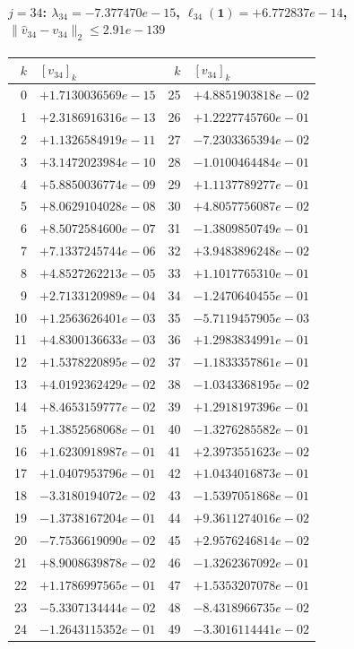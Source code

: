 \documentclass[11pt]{article}
\begin{document}
\paragraph{$j = 34$: $\lambda_{34} = -7.377470e-15$, \quad $\ell_{34}(\mathbf{1}) = +6.772837e-14$, \quad $\|\hat{v}_{34} - v_{34}\|_2 \leq 2.91e-139$}
\begin{center}
{\footnotesize
\begin{tabular}{r@{\;\;}l@{\quad}r@{\;\;}l}
\toprule
$k$ & $[v_{34}]_k$ & $k$ & $[v_{34}]_k$ \\
\midrule
0 & $+1.7130036569e-15$ & 25 & $+4.8851903818e-02$ \\
1 & $+2.3186916316e-13$ & 26 & $+1.2227745760e-01$ \\
2 & $+1.1326584919e-11$ & 27 & $-7.2303365394e-02$ \\
3 & $+3.1472023984e-10$ & 28 & $-1.0100464484e-01$ \\
4 & $+5.8850036774e-09$ & 29 & $+1.1137789277e-01$ \\
5 & $+8.0629104028e-08$ & 30 & $+4.8057756087e-02$ \\
6 & $+8.5072584600e-07$ & 31 & $-1.3809850749e-01$ \\
7 & $+7.1337245744e-06$ & 32 & $+3.9483896248e-02$ \\
8 & $+4.8527262213e-05$ & 33 & $+1.1017765310e-01$ \\
9 & $+2.7133120989e-04$ & 34 & $-1.2470640455e-01$ \\
10 & $+1.2563626401e-03$ & 35 & $-5.7119457905e-03$ \\
11 & $+4.8300136633e-03$ & 36 & $+1.2983834991e-01$ \\
12 & $+1.5378220895e-02$ & 37 & $-1.1833357861e-01$ \\
13 & $+4.0192362429e-02$ & 38 & $-1.0343368195e-02$ \\
14 & $+8.4653159777e-02$ & 39 & $+1.2918197396e-01$ \\
15 & $+1.3852568068e-01$ & 40 & $-1.3276285582e-01$ \\
16 & $+1.6230918987e-01$ & 41 & $+2.3973551623e-02$ \\
17 & $+1.0407953796e-01$ & 42 & $+1.0434016873e-01$ \\
18 & $-3.3180194072e-02$ & 43 & $-1.5397051868e-01$ \\
19 & $-1.3738167204e-01$ & 44 & $+9.3611274016e-02$ \\
20 & $-7.7536619090e-02$ & 45 & $+2.9576246814e-02$ \\
21 & $+8.9008639878e-02$ & 46 & $-1.3262367092e-01$ \\
22 & $+1.1786997565e-01$ & 47 & $+1.5353207078e-01$ \\
23 & $-5.3307134444e-02$ & 48 & $-8.4318966735e-02$ \\
24 & $-1.2643115352e-01$ & 49 & $-3.3016114441e-02$ \\
\bottomrule
\end{tabular}
}
\end{center}
\end{document}
